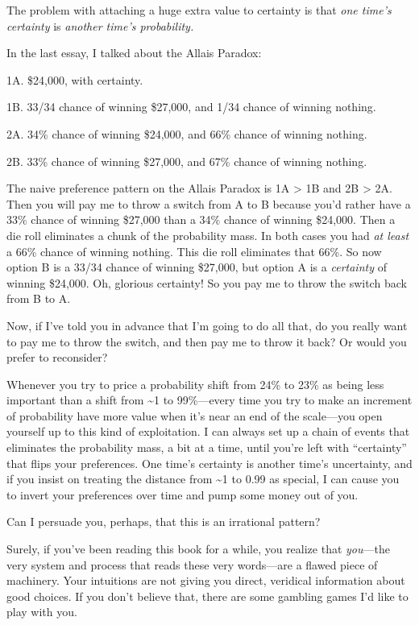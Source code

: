 {
 The problem with attaching a huge extra value to certainty is that
\textit{one time's certainty} is \textit{another
time's probability.}}

{
 In the last essay, I talked about the Allais Paradox:}

{
 1A. \$24,000, with certainty.}

{
 1B. 33/34 chance of winning \$27,000, and 1/34 chance of winning
nothing.}

{
 2A. 34\% chance of winning \$24,000, and 66\% chance of winning
nothing.}

{
 2B. 33\% chance of winning \$27,000, and 67\% chance of winning
nothing.}

{
 The naive preference pattern on the Allais Paradox is 1A
{\textgreater} 1B and 2B {\textgreater} 2A. Then you will pay me to
throw a switch from A to B because you'd rather have a
33\% chance of winning \$27,000 than a 34\% chance of winning \$24,000.
Then a die roll eliminates a chunk of the probability mass. In both
cases you had \textit{at least} a 66\% chance of winning nothing. This
die roll eliminates that 66\%. So now option B is a 33/34 chance of
winning \$27,000, but option A is a \textit{certainty} of winning
\$24,000. Oh, glorious certainty! So you pay me to throw the switch
back from B to A.}

{
 Now, if I've told you in advance that
I'm going to do all that, do you really want to pay me
to throw the switch, and then pay me to throw it back? Or would you
prefer to reconsider?}

{
 Whenever you try to price a probability shift from 24\% to 23\% as
being less important than a shift from \~{}1 to 99\%---every time you
try to make an increment of probability have more value when
it's near an end of the scale---you open yourself up to
this kind of exploitation. I can always set up a chain of events that
eliminates the probability mass, a bit at a time, until
you're left with
``certainty'' that flips your
preferences. One time's certainty is another
time's uncertainty, and if you insist on treating the
distance from \~{}1 to 0.99 as special, I can cause you to invert your
preferences over time and pump some money out of you.}

{
 Can I persuade you, perhaps, that this is an irrational pattern?}

{
 Surely, if you've been reading this book for a
while, you realize that \textit{you}{}---the very system and process
that reads these very words---are a flawed piece of machinery. Your
intuitions are not giving you direct, veridical information about good
choices. If you don't believe that, there are some
gambling games I'd like to play with you.}

